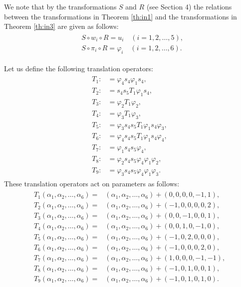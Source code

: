 We note that by the transformations $S$ and $R$ (see Section 4) the relations between the transformations in Theorem \ref{th:in1} and the transformations in Theorem \ref{th:in3} are given as follows:
\begin{align}
\begin{split}
&S \circ w_i \circ R=u_i \quad (i=1,2,\dots,5),\\
&S \circ \pi_i \circ R={\varphi}_i \quad (i=1,2,\dots,6).
\end{split}
\end{align}




\begin{prop}
Let us define the following translation operators\rm{:\rm}
\begin{align}
\begin{split}
T_1:&={\varphi}_4s_4{\varphi}_1s_4,\\
T_2:&=s_4s_5T_1{\varphi}_1s_4,\\
T_3:&={\varphi}_2T_1{\varphi}_2,\\
T_4:&={\varphi}_3T_1{\varphi}_3,\\
T_5:&={\varphi}_3s_4s_5T_1{\varphi}_1s_4{\varphi}_3,\\
T_6:&={\varphi}_4s_4s_5T_1{\varphi}_1s_4{\varphi}_4,\\
T_7:&={\varphi}_1s_4s_5{\varphi}_4,\\
T_8:&={\varphi}_2s_4s_5{\varphi}_4{\varphi}_1{\varphi}_2,\\
T_9:&={\varphi}_3s_4s_5{\varphi}_4{\varphi}_1{\varphi}_3.
\end{split}
\end{align}
These translation operators act on parameters as follows\rm{:\rm}
\begin{align}
\begin{split}
T_1(\alpha_1,\alpha_2,\dots,\alpha_6)=&(\alpha_1,\alpha_2,\dots,\alpha_6)+(0,0,0,0,-1,1),\\
T_2(\alpha_1,\alpha_2,\dots,\alpha_6)=&(\alpha_1,\alpha_2,\dots,\alpha_6)+(-1,0,0,0,0,2),\\
T_3(\alpha_1,\alpha_2,\dots,\alpha_6)=&(\alpha_1,\alpha_2,\dots,\alpha_6)+(0,0,-1,0,0,1),\\
T_4(\alpha_1,\alpha_2,\dots,\alpha_6)=&(\alpha_1,\alpha_2,\dots,\alpha_6)+(0,0,1,0,-1,0),\\
T_5(\alpha_1,\alpha_2,\dots,\alpha_6)=&(\alpha_1,\alpha_2,\dots,\alpha_6)+(-1,0,2,0,0,0),\\
T_6(\alpha_1,\alpha_2,\dots,\alpha_6)=&(\alpha_1,\alpha_2,\dots,\alpha_6)+(-1,0,0,0,2,0),\\
T_7(\alpha_1,\alpha_2,\dots,\alpha_6)=&(\alpha_1,\alpha_2,\dots,\alpha_6)+(1,0,0,0,-1,-1),\\
T_8(\alpha_1,\alpha_2,\dots,\alpha_6)=&(\alpha_1,\alpha_2,\dots,\alpha_6)+(-1,0,1,0,0,1),\\
T_9(\alpha_1,\alpha_2,\dots,\alpha_6)=&(\alpha_1,\alpha_2,\dots,\alpha_6)+(-1,0,1,0,1,0).
\end{split}
\end{align}
\end{prop}
